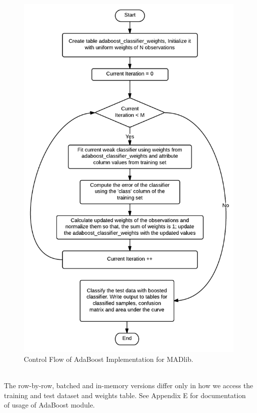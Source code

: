 \begin{figure}[h]
\centering
\includegraphics[scale=0.5]{adaimp.png}
\caption{Control Flow of AdaBoost Implementation for MADlib.}
\label{fig:adaimp}
\end{figure}

~~\\
The row-by-row, batched and in-memory versions differ only in how we access the training and test dataset and weights table. See Appendix E for documentation of usage of AdaBoost module.


